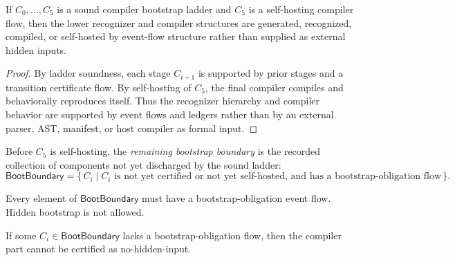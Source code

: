 \begin{theorem}
\label{thm:self-hosting-compiler-sound-ladder-discharges}
If $C_0,\ldots,C_5$ is a sound compiler bootstrap ladder and $C_5$ is a self-hosting compiler flow, then the lower recognizer and compiler structures are generated, recognized, compiled, or self-hosted by event-flow structure rather than supplied as external hidden inputs.
\end{theorem}

\begin{proof}
By ladder soundness, each stage $C_{i+1}$ is supported by prior stages and a transition certificate flow. By self-hosting of $C_5$, the final compiler compiles and behaviorally reproduces itself. Thus the recognizer hierarchy and compiler behavior are supported by event flows and ledgers rather than by an external parser, AST, manifest, or host compiler as formal input.
\end{proof}

\begin{definition}
\label{def:self-hosting-compiler-remaining-boundary}
Before $C_5$ is self-hosting, the \emph{remaining bootstrap boundary} is the recorded collection of components not yet discharged by the sound ladder:
$$
  \mathsf{BootBoundary}
  =
  \{\,C_i\mid C_i\text{ is not yet certified or not yet self-hosted, and has a bootstrap-obligation flow}\,\}.
$$
\end{definition}

\begin{principle}
\label{prin:self-hosting-compiler-boundary-visible}
Every element of $\mathsf{BootBoundary}$ must have a bootstrap-obligation event flow. Hidden bootstrap is not allowed.
\end{principle}

\begin{theorem}
\label{thm:self-hosting-compiler-invisible-bootstrap-blocks}
If some $C_i\in\mathsf{BootBoundary}$ lacks a bootstrap-obligation flow, then the compiler part cannot be certified as no-hidden-input.
\end{theorem}

